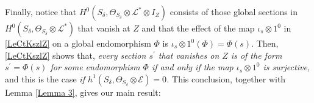 \documentclass{amsart} %
\theoremstyle{definition}
\newcommand{\cts}{\Theta_{S_{\delta}}}
\newcommand{\cs}{S_{\delta}}
\newcommand{\PP}{\mathbb{P}}
\newcommand{\mcL}{\mathcal{L}}
\newcommand{\mcO}{\mathcal{O}}
\newcommand{\mcC}{\mathcal{C}}
\newcommand{\mcE}{\mathcal{E}}
\begin{document}
 Finally, notice that $ H^0(\cs, \cts \otimes \mcL^* \otimes I_Z ) $ consists of  those global sections
 in $ H^0(\cs, \cts \otimes \mcL^* ) $ that vanish at $ Z $ and that the effect of the map
 $ \iota_{s}\otimes 1^0 $ in \eqref{LeCtKszlZ} %
 on a global endomorphism $ \Phi $ is $ \iota_{s}\otimes 1^0( \Phi ) = \Phi( s ) $.
 Then, \eqref{LeCtKszlZ} shows that, \textit{every section $ s^{\prime} $ that vanishes on
 $ Z $ is of the form $ s^{\prime} = \Phi( s ) $ for some endomorphism $ \Phi $ if and only
 if the map $ \iota_{s}\otimes 1^0 $ is surjective, } and this is the case \textit{if
 $ h^1(S_{\delta}, \cts \otimes \mcE) = 0 $.}
 This conclusion, together with Lemma \ref{Lemma 3}, gives our main result:

%
%
%
%
\end{document}
